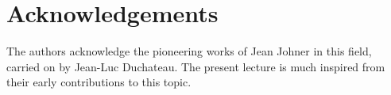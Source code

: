 \section*{Acknowledgements}
The authors acknowledge the pioneering works of Jean Johner in this field, carried on by Jean-Luc Duchateau. The present lecture is much inspired from their early contributions to this topic.
